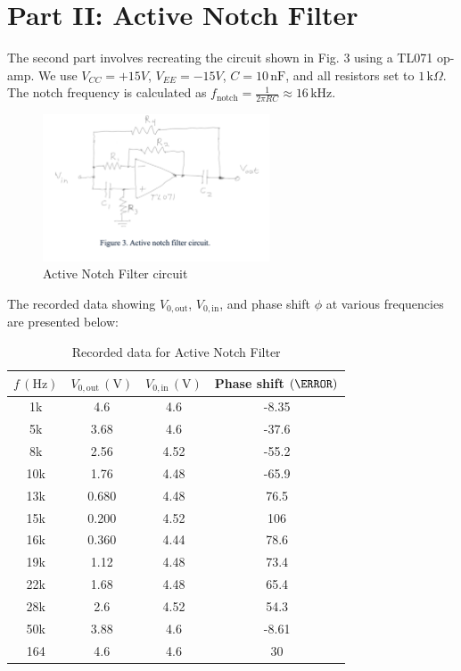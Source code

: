 \documentclass{article}
\begin{document}
\section*{Part II: Active Notch Filter}
The second part involves recreating the circuit shown in Fig. 3 using a TL071 
op-amp. We use \( V_{CC} = +15V \), \( V_{EE} = -15V \), \( C = 10\,\text{nF} \), 
and all resistors set to \( 1\,\text{k}\Omega \). The notch frequency is 
calculated as \( f_{\text{notch}} = \frac{1}{2\pi RC} \approx 16\,\text{kHz} \).

\begin{figure}[H]
    \centering
    \includegraphics[width=0.6\textwidth]{img/Lab 9/1_7.png} %
    \caption{Active Notch Filter circuit}
\end{figure}

The recorded data showing \( V_{0,\text{out}} \), \( V_{0,\text{in}} \), 
and phase shift \( \phi \) at various frequencies are presented below:

\begin{table}[H]
\centering
\begin{tabular}{|c|c|c|c|}
\hline
\( f \, (\text{Hz}) \) & \( V_{0,\text{out}} \, (\text{V}) \) & \( V_{0,\text{in}} \, (\text{V}) \) & Phase shift \( (\degree) \) \\
\hline
1k   & 4.6   & 4.6  & -8.35  \\
5k   & 3.68  & 4.6  & -37.6  \\
8k   & 2.56  & 4.52 & -55.2  \\
10k  & 1.76  & 4.48 & -65.9  \\
13k  & 0.680 & 4.48 & 76.5   \\
15k  & 0.200 & 4.52 & 106    \\
16k  & 0.360 & 4.44 & 78.6   \\
19k  & 1.12  & 4.48 & 73.4   \\
22k  & 1.68  & 4.48 & 65.4   \\
28k  & 2.6   & 4.52 & 54.3   \\
50k  & 3.88  & 4.6  & -8.61  \\
164  & 4.6   & 4.6  & 30     \\
\hline
\end{tabular}
\caption{Recorded data for Active Notch Filter}
\end{table}
\end{document}
